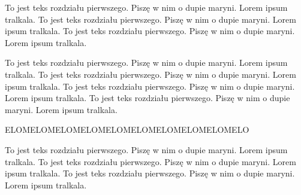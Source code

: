 \documentclass[../main/main.tex]{subfiles}
\begin{document}
To jest teks rozdziału pierwszego\cite{Nowak}. Piszę w nim o dupie maryni.
Lorem ipsum tralkala. To jest teks rozdziału pierwszego. Piszę w nim o dupie maryni.
Lorem ipsum tralkala. To jest teks rozdziału pierwszego. Piszę w nim o dupie maryni.
Lorem ipsum tralkala\cite{Kowalski}. 



To jest teks rozdziału pierwszego. Piszę w nim o dupie maryni.
Lorem ipsum tralkala. To jest teks rozdziału pierwszego. Piszę w nim o dupie maryni.
Lorem ipsum tralkala. 
To jest teks rozdziału pierwszego. Piszę w nim o dupie maryni.
Lorem ipsum tralkala. To jest teks rozdziału pierwszego. Piszę w nim o dupie maryni.
Lorem ipsum tralkala.  

ELOMELOMELOMELOMELOMELOMELOMELOMELOMELO


To jest teks rozdziału pierwszego. Piszę w nim o dupie maryni.
Lorem ipsum tralkala. To jest teks rozdziału pierwszego. Piszę w nim o dupie maryni.
Lorem ipsum tralkala. To jest teks rozdziału pierwszego. Piszę w nim o dupie maryni.
Lorem ipsum tralkala. 
\end{document}

